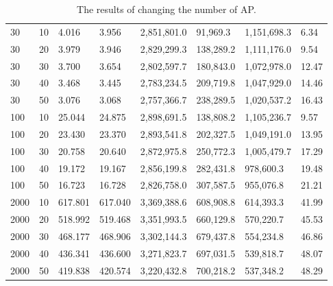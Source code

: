 {\begin{landscape}
\begin{table}
\begin{tabularx}{\linewidth}{|X|X|X|X|X|X|X|X|}
                        30 & 10 & 4.016 & 3.956 & 2,851,801.0 & 91,969.3 & 1,151,698.3 & 6.34 \\
                        30 & 20 & 3.979 & 3.946 & 2,829,299.3 & 138,289.2 & 1,111,176.0 & 9.54 \\
                        30 & 30 & 3.700 & 3.654 & 2,802,597.7 & 180,843.0 & 1,072,978.0 & 12.47 \\
                        30 & 40 & 3.468 & 3.445 & 2,783,234.5 & 209,719.8 & 1,047,929.0 & 14.46 \\
                        30 & 50 & 3.076 & 3.068 & 2,757,366.7 & 238,289.5 & 1,020,537.2 & 16.43 \\
                        100 & 10 & 25.044 & 24.875 & 2,898,691.5 & 138,808.2 & 1,105,236.7 & 9.57 \\
                        100 & 20 & 23.430 & 23.370 & 2,893,541.8 & 202,327.5 & 1,049,191.0 & 13.95 \\
                        100 & 30 & 20.758 & 20.640 & 2,872,975.8 & 250,772.3 & 1,005,479.7 & 17.29 \\
                        100 & 40 & 19.172 & 19.167 & 2,856,199.8 & 282,431.8 & 978,600.3 & 19.48 \\
                        100 & 50 & 16.723 & 16.728 & 2,826,758.0 & 307,587.5 & 955,076.8 & 21.21 \\
                        2000 & 10 & 617.801 & 617.040 & 3,369,388.6 & 608,908.8 & 614,393.3 & 41.99 \\
                        2000 & 20 & 518.992 & 519.468 & 3,351,993.5 & 660,129.8 & 570,220.7 & 45.53 \\
                        2000 & 30 & 468.177 & 468.906 & 3,302,144.3 & 679,437.8 & 554,234.8 & 46.86 \\
                        2000 & 40 & 436.341 & 436.600 & 3,271,823.7 & 697,031.5 & 539,818.7 & 48.07 \\
                        2000 & 50 & 419.838 & 420.574 & 3,220,432.8 & 700,218.2 & 537,348.2 & 48.29 \\
                        \hline
                    \end{tabularx}
                    \caption{The results of changing the number of AP.}
                    \label{tab:num_aps}
                \end{table}
            \end{landscape}
        }

